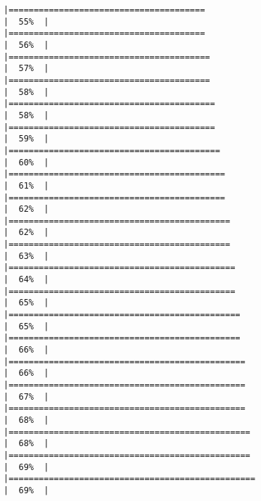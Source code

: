 \documentclass[
]{book}
\begin{document}
\begin{verbatim}
|=======================================                               |  55%  |                                                                              |=======================================                               |  56%  |                                                                              |========================================                              |  57%  |                                                                              |========================================                              |  58%  |                                                                              |=========================================                             |  58%  |                                                                              |=========================================                             |  59%  |                                                                              |==========================================                            |  60%  |                                                                              |===========================================                           |  61%  |                                                                              |===========================================                           |  62%  |                                                                              |============================================                          |  62%  |                                                                              |============================================                          |  63%  |                                                                              |=============================================                         |  64%  |                                                                              |=============================================                         |  65%  |                                                                              |==============================================                        |  65%  |                                                                              |==============================================                        |  66%  |                                                                              |===============================================                       |  66%  |                                                                              |===============================================                       |  67%  |                                                                              |===============================================                       |  68%  |                                                                              |================================================                      |  68%  |                                                                              |================================================                      |  69%  |                                                                              |=================================================                     |  69%  |                                                                              
\end{verbatim}
\end{document}
